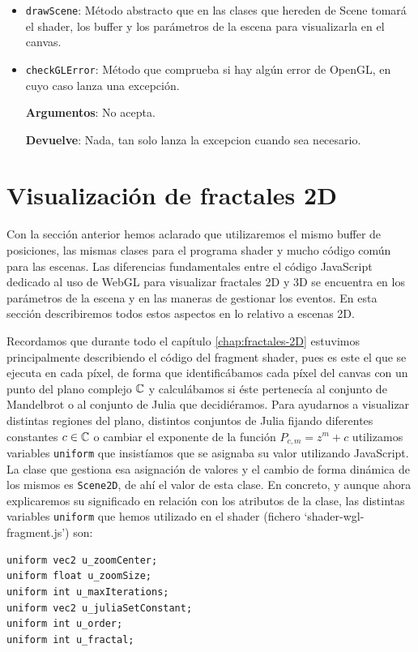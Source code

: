 \begin{itemize}
    \item \verb|drawScene|: Método abstracto que en las clases que hereden de Scene tomará el shader, los buffer y los parámetros de la escena para visualizarla en el canvas.
    
    \item  \verb|checkGLError|: Método que comprueba si hay algún error de OpenGL, en cuyo caso lanza una excepción.
    
    \textbf{Argumentos}: No acepta.
    
    \textbf{Devuelve}: Nada, tan solo lanza la excepcion cuando sea necesario.
\end{itemize}


\section{Visualización de fractales 2D}

Con la sección anterior hemos aclarado que utilizaremos el mismo buffer de posiciones, las mismas clases para el programa shader y mucho código común para las escenas. Las diferencias fundamentales entre el código JavaScript dedicado al uso de WebGL para visualizar fractales 2D y 3D se encuentra en los parámetros de la escena y en las maneras de gestionar los eventos. En esta sección describiremos todos estos aspectos en lo relativo a escenas 2D.

Recordamos que durante todo el capítulo \ref{chap:fractales-2D} estuvimos principalmente describiendo el código del fragment shader, pues es este el que se ejecuta en cada píxel, de forma que identificábamos cada píxel del canvas con un punto del plano complejo $\mathbb{C}$ y calculábamos si éste pertenecía al conjunto de Mandelbrot o al conjunto de Julia que decidiéramos. Para ayudarnos a visualizar distintas regiones del plano, distintos conjuntos de Julia fijando diferentes constantes $c\in\mathbb{C}$ o cambiar el exponente de la función $P_{c,m}=z^m+c$ utilizamos variables \verb|uniform| que insistíamos que se asignaba su valor utilizando JavaScript. La clase que gestiona esa asignación de valores y el cambio de forma dinámica de los mismos es \verb|Scene2D|, de ahí el valor de esta clase. En concreto, y aunque ahora explicaremos su significado en relación con los atributos de la clase, las distintas variables \verb|uniform| que hemos utilizado en el shader (fichero `shader-wgl-fragment.js') son:

\begin{lstlisting}
uniform vec2 u_zoomCenter;
uniform float u_zoomSize;
uniform int u_maxIterations;
uniform vec2 u_juliaSetConstant;
uniform int u_order;
uniform int u_fractal;
\end{lstlisting}

